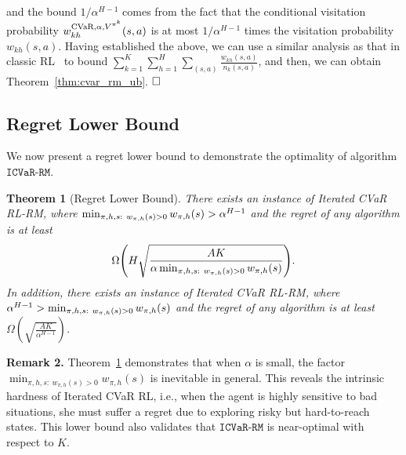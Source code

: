 \documentclass{article} %
\newtheorem{theorem}{Theorem}
\newcommand{\cvar}{\textup{CVaR}}
\newcommand{\algcvar}{\mathtt{ICVaR\mbox{-}RM}}
\begin{document}
	and the bound $1/\alpha^{H-1}$ comes from the fact that the conditional visitation probability $w^{\cvar,\alpha,V^{\pi^k}}_{kh}(s,a)$ is at most $1/\alpha^{H-1}$ times the visitation probability $w_{kh}(s,a)$. 
	Having established the above, we can use a similar analysis as that in classic RL~\citep{azar2017minimax,zanette2019tighter} to bound  $\sum_{k=1}^{K} \! \sum_{h=1}^{H} \! \sum_{(s,a)} \! \frac{w_{kh}(s,a)}{n_k(s,a)}$, and then, we can obtain Theorem~\ref{thm:cvar_rm_ub}.
	$\hfill \square$
	
	
	\subsection{Regret Lower Bound}\label{sec:regret_lb}
	We now present a regret lower bound to demonstrate the optimality of algorithm $\algcvar$. 
	
	\begin{theorem}[Regret Lower Bound] \label{thm:cvar_rm_lb}
		There exists an instance of Iterated CVaR RL-RM, where $\min_{\begin{subarray}{c}\pi,h,s:\  w_{\pi,h}(s)>0\end{subarray}} w_{\pi,h}(s) > \alpha^{H-1}$ and the regret of any algorithm is at least 
		\begin{align}
			\Omega \Bigg( H \sqrt{\frac{AK}{\alpha \min_{\begin{subarray}{c}\pi,h,s:\  w_{\pi,h}(s)>0\end{subarray}} w_{\pi,h}(s)} } \Bigg) . \label{eq:lb_min_w}
		\end{align}
		In addition, there exists an instance of Iterated CVaR RL-RM, where $\alpha^{H-1} > \min_{\begin{subarray}{c}\pi,h,s:\  w_{\pi,h}(s)>0\end{subarray}} w_{\pi,h}(s)$ and the regret of any algorithm is at least 
		$
		\Omega ( \sqrt{\frac{AK}{{\alpha}^{H-1}}} ) 
		$.
	\end{theorem}
	
	
	\textbf{Remark 2.} 
	Theorem~\ref{thm:cvar_rm_lb} demonstrates that when $\alpha$ is small, the factor $\min_{\pi,h,s:\  w_{\pi,h}(s)>0} w_{\pi,h}(s)$ is inevitable in general.
	This reveals the intrinsic hardness of Iterated CVaR RL, i.e., when the agent is highly sensitive to bad situations, she must suffer a regret due to exploring risky but hard-to-reach states.
	This lower bound also validates that $\algcvar$ is near-optimal with respect to $K$. 
	
\end{document}

